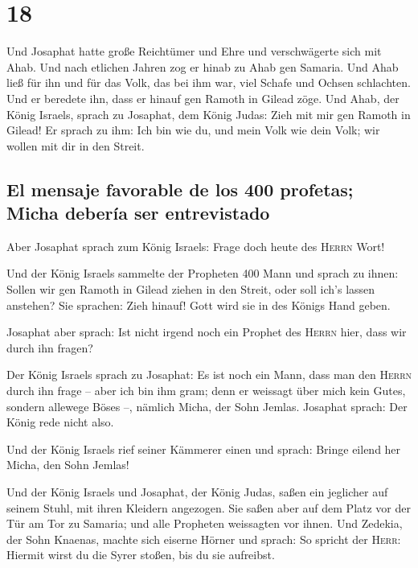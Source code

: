 \hypertarget{section-17}{%
\section{18}\label{section-17}}

 Und Josaphat hatte große Reichtümer und Ehre und
verschwägerte sich mit Ahab.  Und nach etlichen Jahren zog
er hinab zu Ahab gen Samaria. Und Ahab ließ für ihn und für das Volk,
das bei ihm war, viel Schafe und Ochsen schlachten. Und er beredete ihn,
dass er hinauf gen Ramoth in Gilead zöge.  Und Ahab, der
König Israels, sprach zu Josaphat, dem König Judas: Zieh mit mir gen
Ramoth in Gilead! Er sprach zu ihm: Ich bin wie du, und mein Volk wie
dein Volk; wir wollen mit dir in den Streit.

\hypertarget{el-mensaje-favorable-de-los-400-profetas-micha-deberuxeda-ser-entrevistado}{%
\subsection{El mensaje favorable de los 400 profetas; Micha debería ser
entrevistado}\label{el-mensaje-favorable-de-los-400-profetas-micha-deberuxeda-ser-entrevistado}}

 Aber Josaphat sprach zum König Israels: Frage doch heute
des \textsc{Herrn} Wort!

 Und der König Israels sammelte der Propheten 400 Mann und
sprach zu ihnen: Sollen wir gen Ramoth in Gilead ziehen in den Streit,
oder soll ich's lassen anstehen? Sie sprachen: Zieh hinauf! Gott wird
sie in des Königs Hand geben.

 Josaphat aber sprach: Ist nicht irgend noch ein Prophet
des \textsc{Herrn} hier, dass wir durch ihn fragen?

 Der König Israels sprach zu Josaphat: Es ist noch ein
Mann, dass man den \textsc{Herrn} durch ihn frage -- aber ich bin ihm
gram; denn er weissagt über mich kein Gutes, sondern allewege Böses --,
nämlich Micha, der Sohn Jemlas. Josaphat sprach: Der König rede nicht
also.

 Und der König Israels rief seiner Kämmerer einen und
sprach: Bringe eilend her Micha, den Sohn Jemlas!

 Und der König Israels und Josaphat, der König Judas,
saßen ein jeglicher auf seinem Stuhl, mit ihren Kleidern angezogen. Sie
saßen aber auf dem Platz vor der Tür am Tor zu Samaria; und alle
Propheten weissagten vor ihnen.  Und Zedekia, der Sohn
Knaenas, machte sich eiserne Hörner und sprach: So spricht der
\textsc{Herr}: Hiermit wirst du die Syrer stoßen, bis du sie aufreibst.

